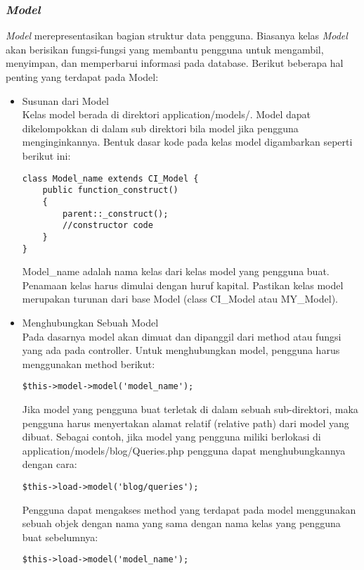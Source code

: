 	\subsubsection{\textit{Model}}
	\textit{Model} merepresentasikan bagian struktur data pengguna. Biasanya kelas \textit{Model} akan berisikan fungsi-fungsi yang membantu pengguna untuk mengambil, menyimpan, dan memperbarui informasi pada database. Berikut beberapa hal penting yang terdapat pada Model:
	\begin{itemize}
		\item Susunan dari Model \\
		Kelas model berada di direktori application/models/. Model dapat dikelompokkan di dalam sub direktori bila model jika pengguna menginginkannya. Bentuk dasar kode pada kelas model digambarkan seperti berikut ini:
		\begin{lstlisting}[backgroundcolor = \color{lightgray}]
class Model_name extends CI_Model {
	public function_construct()
	{
		parent::_construct();
		//constructor code
	}
}
		\end{lstlisting}
		
		Model\_name adalah nama kelas dari kelas model yang pengguna buat. Penamaan kelas harus dimulai dengan huruf kapital. Pastikan kelas model merupakan turunan dari base Model (class CI\_Model atau MY\_Model).
		
		\item Menghubungkan Sebuah Model \\
		Pada dasarnya model akan dimuat dan dipanggil dari method atau fungsi yang ada pada controller. Untuk menghubungkan model, pengguna harus menggunakan method berikut:
		\begin{lstlisting}[backgroundcolor = \color{lightgray}]
$this->model->model('model_name');
		\end{lstlisting}
		
		Jika model yang pengguna buat terletak di dalam sebuah sub-direktori, maka pengguna harus menyertakan alamat relatif (relative path) dari model yang dibuat. Sebagai contoh, jika model yang pengguna miliki berlokasi di application/models/blog/Queries.php pengguna dapat menghubungkannya dengan cara:
		\begin{lstlisting}[backgroundcolor = \color{lightgray}]
$this->load->model('blog/queries');
		\end{lstlisting}
		
		Pengguna dapat mengakses method yang terdapat pada model menggunakan sebuah objek dengan nama yang sama dengan nama kelas yang pengguna buat sebelumnya:
		\begin{lstlisting}[backgroundcolor = \color{lightgray}]
$this->load->model('model_name');
		

\end{lstlisting}
\end{itemize}
